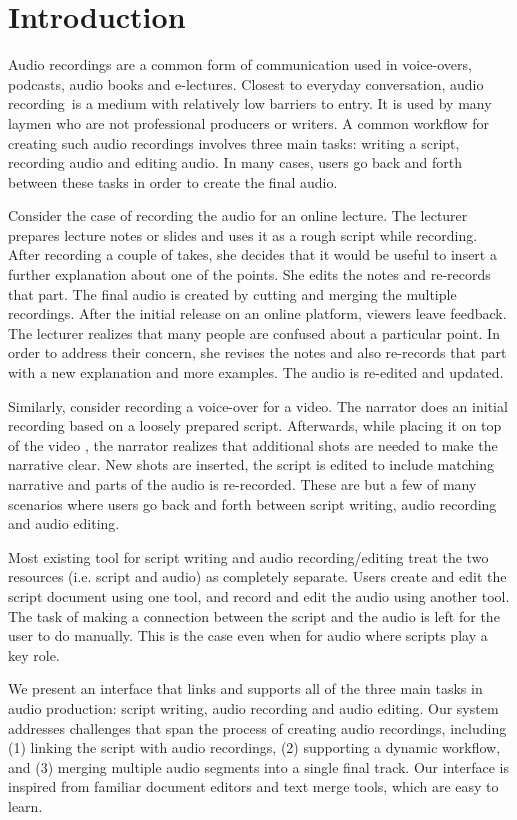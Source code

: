 \section{Introduction}
Audio recordings are a common form of communication used in voice-overs, podcasts, audio books and e-lectures. Closest to everyday conversation, audio recording\ is a medium with relatively low barriers to entry. It is used by many laymen who are not professional producers or writers. A common workflow for creating such audio recordings involves three main tasks: writing a script, recording audio and editing audio. In many cases, users go back and forth between these tasks in order to create the final audio. 

Consider the case of recording the audio for an online lecture. The lecturer prepares lecture notes or slides and uses it as a rough script while recording. After recording a couple of takes, she decides that it would be useful to insert a further explanation about one of the points. She edits the notes and re-records that part. The final audio is created by cutting and merging the multiple recordings. After the initial release on an online platform, viewers leave feedback. The lecturer realizes that many people are confused about a particular point. In order to address their concern, she revises the notes and also  re-records that part with a new explanation and more examples. The audio is re-edited and updated. 

Similarly, consider recording a voice-over for a video. The narrator does an initial recording based on a loosely prepared script. Afterwards, while placing it on top of the video , the narrator realizes that additional shots are needed to make the narrative clear. New shots are inserted, the script is edited to include matching narrative and parts of the audio is re-recorded.
These are but a few of many scenarios where
users go back and forth between script writing, audio
recording and audio editing.



Most existing tool for script writing and audio recording/editing treat the two resources (i.e. script and audio) as completely separate. Users create and edit the script document using one tool, and record and edit the audio using another tool.
The task of making a connection between the script and the audio is left for the user to do manually. This is the case even
when for audio where scripts play a key role.
  

We present an interface that links and supports all of the three main tasks in audio production: script writing, audio recording and audio editing. Our system addresses challenges that span the process of creating audio recordings, including (1) linking the script  with audio recordings, (2) supporting a dynamic workflow, and (3) merging multiple audio segments into a single final track. Our interface is inspired from familiar document editors and text merge tools, which are easy to learn.

